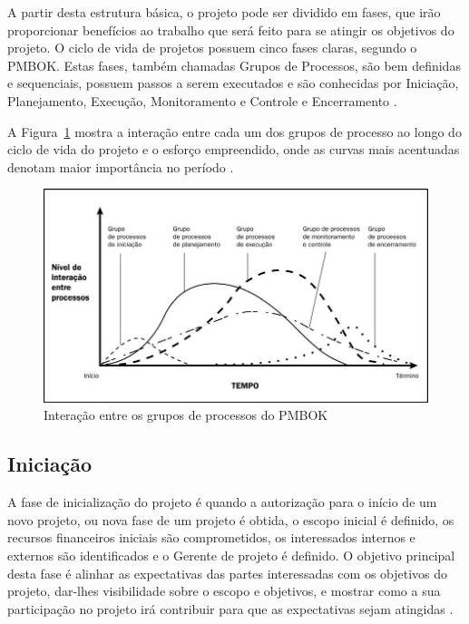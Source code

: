 \documentclass[
    12pt,               %
    openright,          %
    twoside,            %
    a4paper,            %
    chapter=TITLE,     %
    english,            %
    spanish,            %
    portuguese              %
    ]{abntex2}
\begin{document}
A partir desta estrutura básica, o projeto pode ser dividido em fases, que irão proporcionar benefícios ao trabalho que será feito para se atingir os objetivos do projeto. O ciclo de vida de projetos possuem cinco fases claras, segundo o PMBOK. Estas fases, também chamadas Grupos de Processos, são bem definidas e sequenciais, possuem passos a serem executados e são conhecidas por Iniciação, Planejamento, Execução, Monitoramento e Controle e Encerramento \cite[p.~14]{Cruz2013}. 

A Figura~\ref{fig:grupo_processos} mostra a interação entre cada um dos grupos de processo ao longo do ciclo de vida do projeto e o esforço empreendido, onde as curvas mais acentuadas denotam maior importância no período \cite[p.~15]{Rafael2012}. 

\begin{figure}[htb]
\RawFloats
	\caption{\label{fig:grupo_processos}Interação entre os grupos de processos do PMBOK}
	\begin{center}
	    \includegraphics[scale=0.50]{figuras/grupos_processos.jpg}
	\end{center}
\end{figure}

\subsection{Iniciação}
A fase de inicialização do projeto é quando a autorização para o início de um novo projeto, ou nova fase de um projeto é obtida, o escopo inicial é definido, os recursos financeiros iniciais são comprometidos, os interessados internos e externos são identificados e o Gerente de projeto é definido. O objetivo principal desta fase é alinhar as expectativas das partes interessadas com os objetivos do projeto, dar-lhes visibilidade sobre o escopo e objetivos, e mostrar como a sua participação no projeto irá contribuir para que as expectativas sejam atingidas \cite[p.~54]{pmi2013}.
\end{document}
